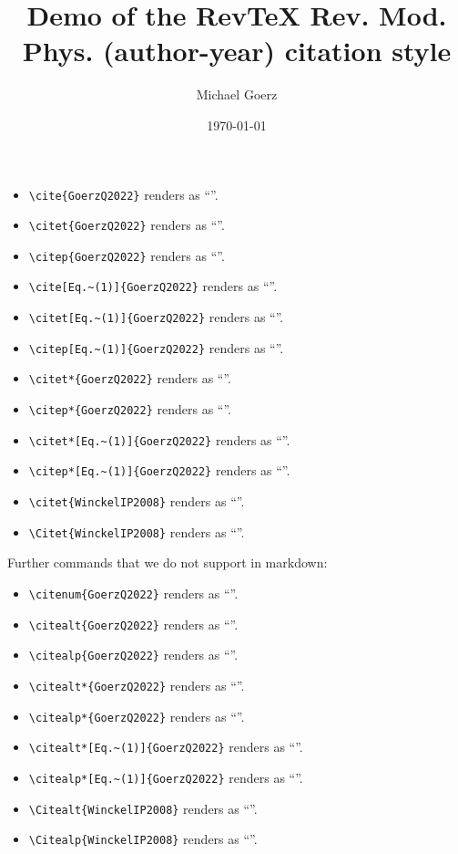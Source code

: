 \documentclass[aps,rmp,onecolumn,noshowpacs,superscriptaddress,preprintnumbers,%
kamsmath,amssymb,notitlepage,letterpaper]{revtex4-2}
\def\Author{Michael Goerz}
\def\Title{Demo of the  RevTeX Rev. Mod. Phys. (author-year) citation style}
\begin{document}
\title{\Title}
\author{\Author}
\date{\today}

\maketitle


\begin{itemize}
  \item \verb|\cite{GoerzQ2022}| renders as ``\cite{GoerzQ2022}''.
  \item \verb|\citet{GoerzQ2022}| renders as ``\citet{GoerzQ2022}''.
  \item \verb|\citep{GoerzQ2022}| renders as ``\citep{GoerzQ2022}''.
  \item \verb|\cite[Eq.~(1)]{GoerzQ2022}| renders as ``\cite[Eq.~(1)]{GoerzQ2022}''.
  \item \verb|\citet[Eq.~(1)]{GoerzQ2022}| renders as ``\citet[Eq.~(1)]{GoerzQ2022}''.
  \item \verb|\citep[Eq.~(1)]{GoerzQ2022}| renders as ``\citep[Eq.~(1)]{GoerzQ2022}''.
  \item \verb|\citet*{GoerzQ2022}| renders as ``\citet*{GoerzQ2022}''.
  \item \verb|\citep*{GoerzQ2022}| renders as ``\citep*{GoerzQ2022}''.
  \item \verb|\citet*[Eq.~(1)]{GoerzQ2022}| renders as ``\citet*[Eq.~(1)]{GoerzQ2022}''.
  \item \verb|\citep*[Eq.~(1)]{GoerzQ2022}| renders as ``\citep*[Eq.~(1)]{GoerzQ2022}''.
  \item \verb|\citet{WinckelIP2008}| renders as ``\citet{WinckelIP2008}''.
  \item \verb|\Citet{WinckelIP2008}| renders as ``''.
\end{itemize}

Further commands that we do not support in markdown:

\begin{itemize}
  \item \verb|\citenum{GoerzQ2022}| renders as ``''.
  \item \verb|\citealt{GoerzQ2022}| renders as ``\citealt{GoerzQ2022}''.
  \item \verb|\citealp{GoerzQ2022}| renders as ``\citealp{GoerzQ2022}''.
  \item \verb|\citealt*{GoerzQ2022}| renders as ``\citealt*{GoerzQ2022}''.
  \item \verb|\citealp*{GoerzQ2022}| renders as ``\citealp*{GoerzQ2022}''.
  \item \verb|\citealt*[Eq.~(1)]{GoerzQ2022}| renders as ``\citealt*[Eq.~(1)]{GoerzQ2022}''.
  \item \verb|\citealp*[Eq.~(1)]{GoerzQ2022}| renders as ``\citealp*[Eq.~(1)]{GoerzQ2022}''.
  \item \verb|\Citealt{WinckelIP2008}| renders as ``''.
  \item \verb|\Citealp{WinckelIP2008}| renders as ``''.
\end{itemize}



\end{document}
